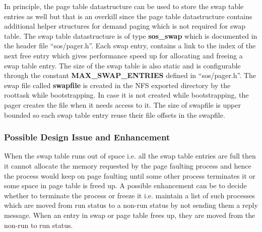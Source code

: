 \documentclass[a4paper, 11pt]{article}
\begin{document}
In principle, the page table datastructure can be used to store the
swap table entries as well but that is an overkill since the page
table datastructure contains additional helper structures for demand
paging which is not required for swap table. The swap table
datastructure is of type {\bf sos\_swap} which is documented in the
header file ``sos/pager.h''. Each swap entry, contains a link to the
index of the next free entry which gives performance speed up for
allocating and freeing a swap table entry. The size of the swap table
is also static and is configurable through the constant {\bf
  MAX\_SWAP\_ENTRIES} defined in ``sos/pager.h''. The swap file called
{\bf swapfile} is created in the NFS exported directory by the
roottask while bootstrapping. In case it is not created while
bootstrapping, the pager creates the file when it needs access to
it. The size of swapfile is upper bounded so each swap table entry
reuse their file offsets in the swapfile.

\subsubsection{Possible Design Issue and Enhancement}
When the swap table runs out of space i.e. all the swap table entries
are full then it cannot allocate the memory requested by the page
faulting process and hence the process would keep on page faulting
until some other process terminates it or some space in page table is
freed up. A possible enhancement can be to
decide whether to terminate the process or freeze it i.e. maintain a
list of such processes which are moved from run status to a non-run
status by not sending them a reply message. When an entry in swap or
page table frees up, they are moved from the non-run to run status.
\end{document}
